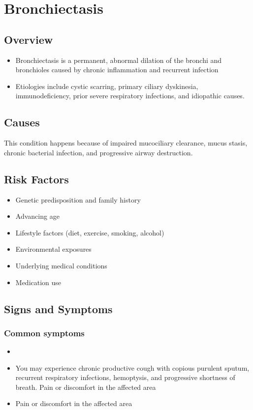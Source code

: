 \chapter{Bronchiectasis}
\label{sec:Bronchiectasis}

\section{Overview}


\begin{itemize}[noitemsep]
  \item Bronchiectasis is a permanent, abnormal dilation of the bronchi and bronchioles caused by chronic inflammation and recurrent infection
  \item Etiologies include cystic scarring, primary ciliary dyskinesia, immunodeficiency, prior severe respiratory infections, and idiopathic causes.
\end{itemize}
\section{Causes}
This condition happens because of impaired mucociliary clearance, mucus stasis, chronic bacterial infection, and progressive airway destruction.     
\section{Risk Factors}

\begin{itemize}[noitemsep]
  \item Genetic predisposition and family history
  \item Advancing age
  \item Lifestyle factors (diet, exercise, smoking, alcohol)
  \item Environmental exposures
  \item Underlying medical conditions
  \item Medication use
\end{itemize}
\section{Signs and Symptoms}

\subsection{Common symptoms}
\begin{itemize}[noitemsep]
  \item \item You may experience chronic productive cough with copious purulent sputum, recurrent respiratory infections, hemoptysis, and progressive shortness of breath. Pain or discomfort in the affected area    \item Pain or discomfort in the affected area
  \end{itemize}

